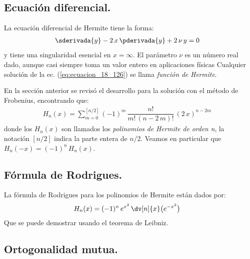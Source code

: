 \subsection{Ecuación diferencial.}

La ecuación diferencial de Hermite tiene la forma:
\begin{align}
\sderivada{y} -  2 \, x \, \pderivada{y} + 2 \, \nu \, y = 0
\label{eq:ecuacion_18_126}
\end{align}
y tiene una singularidad esencial en $x = \infty$. El parámetro $\nu$ es un número real dado, aunque casi siempre toma un valor entero en aplicaciones físicas Cualquier solución de la ec. (\ref{eq:ecuacion_18_126}) se llama \emph{función de Hermite}.
\par
En la sección anterior se revisó el desarrollo para la solución con el método de Frobenius, encontrando que:
\begin{align}
H_{n}(x) = \sum_{m=0}^{[n/2]} (-1)^{m} \, \dfrac{n!}{m! \, (n - 2 \, m)!} \, (2 \, x)^{n-2m}
\label{eq:ecuacion_18_129}
\end{align}
donde los $H_{n}(x)$ son llamados los \emph{polinomios de Hermite de orden n}, la notación $[n/2]$ indica la parte entera de $n/2$. Veamos en particular que $H_{n}(-x) = (-1)^{n} \, H_{n}(x)$.

\subsection{Fórmula de Rodrigues.}

La fórmula de Rodrigues para los polinomios de Hermite están dados por:
\begin{align}
H_{n}(x) = (-1)^{n} \, e^{x^{2}} \, \dv[n]{x} \big( e^{-x^{2}} \big)
\label{eq:ecuacion_18_130}
\end{align}
Que se puede demostrar usando el teorema de Leibniz.

\subsection{Ortogonalidad mutua.}

